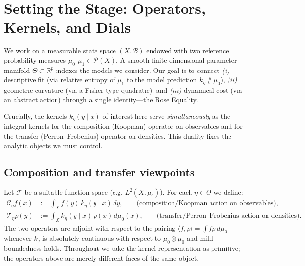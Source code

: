 
\section{Setting the Stage: Operators, Kernels, and Dials}
\label{sec:setting}

We work on a measurable state space $(X,\mathcal B)$ endowed with two reference probability measures $\mu_0,\mu_1\in\mathcal P(X)$.  A smooth finite-dimensional parameter manifold $\Theta\subset\mathbb R^p$ indexes the models we consider.  Our goal is to connect 
\emph{(i)} descriptive fit (via relative entropy of $\mu_1$ to the model prediction $k_\eta\,\#\,\mu_0$), 
\emph{(ii)} geometric curvature (via a Fisher-type quadratic), and 
\emph{(iii)} dynamical cost (via an abstract action)
through a single identity---the Rose Equality.

Crucially, the kernels $k_\eta(y\mid x)$ of interest here serve \emph{simultaneously} as the integral kernels for the composition (Koopman) operator on observables and for the transfer (Perron--Frobenius) operator on densities.  This duality fixes the analytic objects we must control.

\subsection{Composition and transfer viewpoints}
\label{subsec:operators}

Let $\mathcal{F}$ be a suitable function space (e.g. $L^2(X,\mu_0)$).  For each $\eta\in\Theta$ we define:
\begin{align*}
    \mathcal C_\eta f(x)
        &:= \int_X f(y)\,k_\eta(y\mid x)\,dy,\qquad \text{(composition/Koopman action on observables)},\\
    \mathcal T_\eta \rho(y)
        &:= \int_X k_\eta(y\mid x)\,\rho(x)\,d\mu_0(x),\qquad \text{(transfer/Perron--Frobenius action on densities)}.
\end{align*}
The two operators are adjoint with respect to the pairing $\langle f,\rho\rangle = \int f\rho\,d\mu_0$ whenever $k_\eta$ is absolutely continuous with respect to $\mu_0\otimes\mu_0$ and mild boundedness holds.  Throughout we take the kernel representation as primitive; the operators above are merely different faces of the same object.

